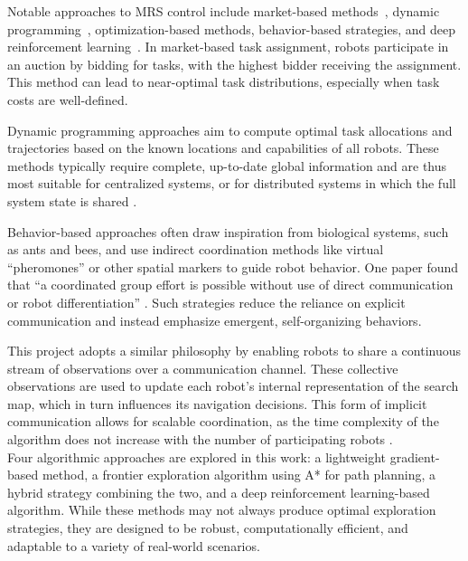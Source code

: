 Notable approaches to MRS control include market-based methods~\cite{trigui2014market}, dynamic programming~\cite{kato2011dp}, optimization-based methods, behavior-based strategies, and deep reinforcement learning~\cite{huttenrauch2019deep-swarm}. 
In market-based task assignment, robots participate in an auction by bidding for tasks, with the highest bidder receiving the assignment. 
This method can lead to near-optimal task distributions, especially when task costs are well-defined.

Dynamic programming approaches aim to compute optimal task allocations and trajectories based on the known locations and capabilities of all robots. 
These methods typically require complete, up-to-date global information and are thus most suitable for centralized systems, or for distributed systems in which the full system state is shared \cite{multi-robot-search-moving-target}.

Behavior-based approaches often draw inspiration from biological systems, such as ants and bees, and use indirect coordination methods like virtual “pheromones” or other spatial markers to guide robot behavior. 
One paper found that “a coordinated group effort is possible without use of direct communication or robot differentiation” \cite{kube2000cooperative-ants}.
Such strategies reduce the reliance on explicit communication and instead emphasize emergent, self-organizing behaviors.\

This project adopts a similar philosophy by enabling robots to share a continuous stream of observations over a communication channel. 
These collective observations are used to update each robot’s internal representation of the search map, which in turn influences its navigation decisions. 
This form of implicit communication allows for scalable coordination, as the time complexity of the algorithm does not increase with the number of participating robots \cite{multi-robot-search-moving-target}.\\

Four algorithmic approaches are explored in this work: a lightweight gradient-based method, a frontier exploration algorithm using A* for path planning, a hybrid strategy combining the two, and a deep reinforcement learning-based algorithm. 
While these methods may not always produce optimal exploration strategies, they are designed to be robust, computationally efficient, and adaptable to a variety of real-world scenarios.
